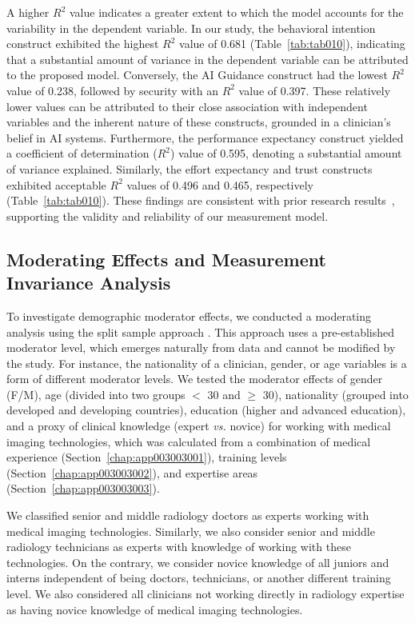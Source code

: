 A higher $R^2$ value indicates a greater extent to which the model accounts for the variability in the dependent variable.
In our study, the behavioral intention construct exhibited the highest $R^2$ value of 0.681 (Table~\ref{tab:tab010}), indicating that a substantial amount of variance in the dependent variable can be attributed to the proposed model.
Conversely, the \ac{AI} Guidance construct had the lowest $R^2$ value of 0.238, followed by security with an $R^2$ value of 0.397. These relatively lower values can be attributed to their close association with independent variables and the inherent nature of these constructs, grounded in a clinician's belief in \ac{AI} systems.
Furthermore, the performance expectancy construct yielded a coefficient of determination ($R^2$) value of 0.595, denoting a substantial amount of variance explained.
Similarly, the effort expectancy and trust constructs exhibited acceptable $R^2$ values of 0.496 and 0.465, respectively (Table~\ref{tab:tab010}).
These findings are consistent with prior research results~\cite{KHALILZADEH2017460}, supporting the validity and reliability of our measurement model.



\subsection{Moderating Effects and Measurement Invariance Analysis}
\label{chap:app003004005}

To investigate demographic moderator effects, we conducted a moderating analysis using the split sample approach \cite{LI2021106581, LI2021106929}.
This approach uses a pre-established moderator level, which emerges naturally from data and cannot be modified by the study.
For instance, the nationality of a clinician, gender, or age variables is a form of different moderator levels.
We tested the moderator effects of gender (F/M), age (divided into two groups $<$ 30 and $\geq$ 30), nationality (grouped into developed and developing countries), education (higher and advanced education), and a proxy of clinical knowledge (expert {\it vs.} novice) for working with medical imaging technologies, which was calculated from a combination of medical experience (Section~\ref{chap:app003003001}), training levels (Section~\ref{chap:app003003002}), and expertise areas (Section~\ref{chap:app003003003}).

We classified senior and middle radiology doctors as experts working with medical imaging technologies.
Similarly, we also consider senior and middle radiology technicians as experts with knowledge of working with these technologies.
On the contrary, we consider novice knowledge of all juniors and interns independent of being doctors, technicians, or another different training level.
We also considered all clinicians not working directly in radiology expertise as having novice knowledge of medical imaging technologies.

